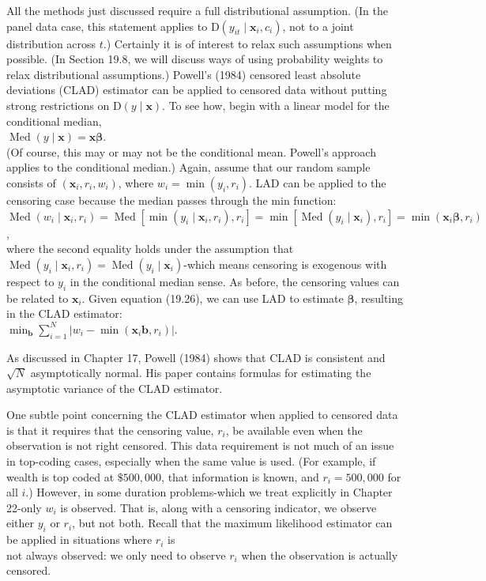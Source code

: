 \documentclass[10pt]{article}
\begin{document}
All the methods just discussed require a full distributional assumption. (In the panel data case, this statement applies to $\mathrm{D}\left(y_{i t} \mid \mathbf{x}_{i}, c_{i}\right)$, not to a joint distribution across $t$.) Certainly it is of interest to relax such assumptions when possible. (In Section 19.8, we will discuss ways of using probability weights to relax distributional assumptions.) Powell's (1984) censored least absolute deviations (CLAD) estimator can be applied to censored data without putting strong restrictions on $\mathrm{D}(y \mid \mathbf{x})$. To see how, begin with a linear model for the conditional median,\\
$\operatorname{Med}(y \mid \mathbf{x})=\mathbf{x} \boldsymbol{\beta}$.\\
(Of course, this may or may not be the conditional mean. Powell's approach applies to the conditional median.) Again, assume that our random sample consists of $\left(\mathbf{x}_{i}, r_{i}, w_{i}\right)$, where $w_{i}=\min \left(y_{i}, r_{i}\right)$. LAD can be applied to the censoring case because the median passes through the min function:\\
$\operatorname{Med}\left(w_{i} \mid \mathbf{x}_{i}, r_{i}\right)=\operatorname{Med}\left[\min \left(y_{i} \mid \mathbf{x}_{i}, r_{i}\right), r_{i}\right]=\min \left[\operatorname{Med}\left(y_{i} \mid \mathbf{x}_{i}\right), r_{i}\right]=\min \left(\mathbf{x}_{i} \boldsymbol{\beta}, r_{i}\right)$,\\
where the second equality holds under the assumption that $\operatorname{Med}\left(y_{i} \mid \mathbf{x}_{i}, r_{i}\right)= \operatorname{Med}\left(y_{i} \mid \mathbf{x}_{i}\right)$-which means censoring is exogenous with respect to $y_{i}$ in the conditional median sense. As before, the censoring values can be related to $\mathbf{x}_{i}$. Given equation (19.26), we can use LAD to estimate $\boldsymbol{\beta}$, resulting in the CLAD estimator:\\
$\min _{\mathbf{b}} \sum_{i=1}^{N}\left|w_{i}-\min \left(\mathbf{x}_{i} \mathbf{b}, r_{i}\right)\right|$.

As discussed in Chapter 17, Powell (1984) shows that CLAD is consistent and $\sqrt{N}$ asymptotically normal. His paper contains formulas for estimating the asymptotic variance of the CLAD estimator.

One subtle point concerning the CLAD estimator when applied to censored data is that it requires that the censoring value, $r_{i}$, be available even when the observation is not right censored. This data requirement is not much of an issue in top-coding cases, especially when the same value is used. (For example, if wealth is top coded at $\$ 500,000$, that information is known, and $r_{i}=500,000$ for all $i$.) However, in some duration problems-which we treat explicitly in Chapter 22-only $w_{i}$ is observed. That is, along with a censoring indicator, we observe either $y_{i}$ or $r_{i}$, but not both. Recall that the maximum likelihood estimator can be applied in situations where $r_{i}$ is\\
not always observed: we only need to observe $r_{i}$ when the observation is actually censored.
\end{document}

